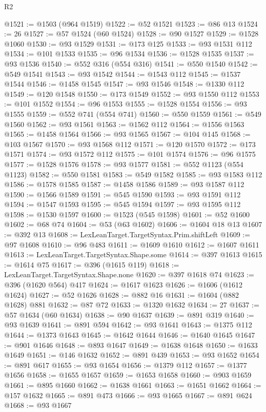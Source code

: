 \begin{lexlean}{R2}
\begin{coremodule}
@1521 := @1503 (@964 @1519)
@1522 := @52 @1521
@1523 := @86 @13
@1524 := 26
@1527 := @57 @1524 (@60 @1524)
@1528 := @90 @1527
@1529 := @1528 @1060
@1530 := @93 @1529
@1531 := @173 @125
@1533 := @93 @1531 @112
@1534 := @101 @1533
@1535 := @96 @1534
@1536 := @1528 @1535
@1537 := @93 @1536
@1540 := @552 @316 (@554 @316)
@1541 := @550 @1540
@1542 := @549 @1541
@1543 := @93 @1542
@1544 := @1543 @112
@1545 := @1537 @1544
@1546 := @1458 @1545
@1547 := @93 @1546
@1548 := @1330 @112
@1549 := @120 @1548
@1550 := @173 @1549
@1552 := @93 @1550 @112
@1553 := @101 @1552
@1554 := @96 @1553
@1555 := @1528 @1554
@1556 := @93 @1555
@1559 := @552 @741 (@554 @741)
@1560 := @550 @1559
@1561 := @549 @1560
@1562 := @93 @1561
@1563 := @1562 @112
@1564 := @1556 @1563
@1565 := @1458 @1564
@1566 := @93 @1565
@1567 := @104 @145
@1568 := @103 @1567
@1570 := @93 @1568 @112
@1571 := @120 @1570
@1572 := @173 @1571
@1574 := @93 @1572 @112
@1575 := @101 @1574
@1576 := @96 @1575
@1577 := @1528 @1576
@1578 := @93 @1577
@1581 := @552 @1123 (@554 @1123)
@1582 := @550 @1581
@1583 := @549 @1582
@1585 := @93 @1583 @112
@1586 := @1578 @1585
@1587 := @1458 @1586
@1589 := @93 @1587 @112
@1590 := @1566 @1589
@1591 := @545 @1590
@1593 := @93 @1591 @112
@1594 := @1547 @1593
@1595 := @545 @1594
@1597 := @93 @1595 @112
@1598 := @1530 @1597
@1600 := @1523 (@545 @1598)
@1601 := @52 @1600
@1602 := @68 @74
@1604 := @53 (@63 @1602)
@1606 := @1604 @18 @13
@1607 := @392 @13
@1608 := LexLeanTarget.TargetSyntax.Prim.shiftLeft
@1609 := @97 @1608
@1610 := @96 @483
@1611 := @1609 @1610
@1612 := @1607 @1611
@1613 := LexLeanTarget.TargetSyntax.Shape.some
@1614 := @397 @1613
@1615 := @1614 @75
@1617 := @396 (@1615 @119)
@1618 := LexLeanTarget.TargetSyntax.Shape.none
@1620 := @397 @1618 @74
@1623 := @396 (@1620 @564) @417
@1624 := @1617 @1623
@1626 := @1606 (@1612 @1624)
@1627 := @52 @1626
@1628 := @882 @16
@1631 := @1604 (@882 @1628) @881
@1632 := @87 @72
@1633 := @1320 @1632
@1634 := 27
@1637 := @57 @1634 (@60 @1634)
@1638 := @90 @1637
@1639 := @891 @319
@1640 := @93 @1639
@1641 := @891 @594
@1642 := @93 @1641
@1643 := @1375 @112
@1644 := @1373 @1643
@1645 := @1642 @1644
@1646 := @1640 @1645
@1647 := @901 @1646
@1648 := @893 @1647
@1649 := @1638 @1648
@1650 := @1633 @1649
@1651 := @146 @1632
@1652 := @891 @439
@1653 := @93 @1652
@1654 := @891 @617
@1655 := @93 @1654
@1656 := @1379 @112
@1657 := @1377 @1656
@1658 := @1655 @1657
@1659 := @1653 @1658
@1660 := @903 @1659
@1661 := @895 @1660
@1662 := @1638 @1661
@1663 := @1651 @1662
@1664 := @157 @1632
@1665 := @891 @473
@1666 := @93 @1665
@1667 := @891 @624
@1668 := @93 @1667

\end{coremodule}
\end{lexlean}
